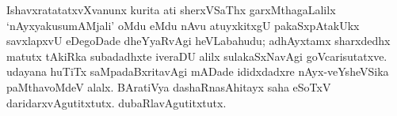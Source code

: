 IshavxratatatxvXvanunx kurita ati sherxVSaThx garxMthagaLalilx `nAyxyakusumAMjali' oMdu eMdu nAvu atuyxkitxgU pakaSxpAtakUkx savxlapxvU eDegoDade dheYyaRvAgi heVLabahudu; adhAyxtamx sharxdedhx matutx tAkiRka subadadhxte iveraDU alilx sulakaSxNavAgi goVcarisutatxve. udayana huTiTx saMpadaBxritavAgi mADade ididxdadxre nAyx-veYsheVSika paMthavoMdeV alalx. BAratiVya dashaRnasAhitayx saha eSoTxV daridarxvAgutitxtutx. dubaRlavAgutitxtutx.


\theendnotes











